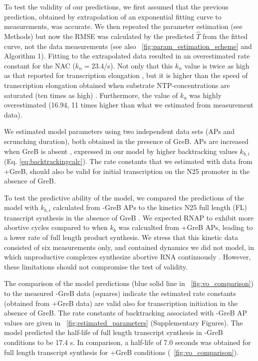 To test the validity of our predictions, we first assumed that the previous
prediction, obtained by extrapolation of an exponential fitting
curve to measurements, was accurate. We then repeated the parameter
estimation (see Methods) but now the RMSE was calculated by the predicted
$\hat T$ from the fitted curve, not the data measurements (see also
\FIG~\ref{fig:param_estimation_scheme} and Algorithm 1). Fitting to the
extrapolated data resulted in an overestimated rate constant for the NAC
($k_n= 23.4$/s). Not only that this $k_n$ value is twice as high as that
reported for transcription elongation \cite{revyakin_abortive_2006}, but it is
higher than the speed of transcription elongation obtained when substrate
NTP-concentrations are saturated (ten times as high)
\cite{bai_mechanochemical_2007}. Furthermore, the value of $k_u$ was highly
overestimated (16.94, 11 times higher than what we estimated from measurement
data).



We estimated model parameters using two independent data sets (APs and
scrunching duration), both obtained in the presence of GreB. APs are increased
when GreB is absent \cite{hsu_initial_2006}, expressed in our model by higher
backtracking values $k_{b,i}$ (Eq. \ref{eq:backtrackingcalc}). The rate
constants that we estimated with data from +GreB, should also be valid for
initial transcription on the N25 promoter in the absence of GreB.  

To test the predictive ability of the model, we compared the predictions of
the model with $k_{b,i}$ calculated from -GreB APs \cite{hsu_initial_2006} to the
kinetics N25 full length (FL) transcript synthesis in the absence of GreB
\cite{vo_vitro_2003-1}. We expected RNAP to exhibit more abortive cycles
compared to when $k_b$ was calcualted from +GreB APs, leading to a lower rate
of full length product synthesis. We stress that this kinetic data consisted
of six measurements only, and contained dynamics we did not model, in which
unproductive complexes synthesize abortive RNA continuously
\cite{vo_vitro_2003-1}. However, these limitations should not compromise the
test of validity.
 
The comparison of the model predictions (blue solid line in
\FIG~\ref{fig:vo_comparison}) to the measured -GreB data (squares) indicate
the estimated rate constants (obtained from +GreB data) are valid also for
transcription initiation in the absence of GreB. The rate constants of
backtracking associated with -GreB AP values are given in
\FIG~\ref{fig:estimated_parameters} (Supplementary Figures). The model
predicted the half-life of full length transcript synthesis in -GreB
conditions to be 17.4 s. In comparison, a half-life of 7.0 seconds was
obtained for full length transcript synthesis for +GreB conditions
(\FIG~\ref{fig:vo_comparison}). 

